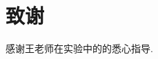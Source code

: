 \documentclass[a4paper]{article}
\begin{document}

\section{致谢}\label{acknowledgments}
感谢王老师在实验中的的悉心指导.
\end{document}
